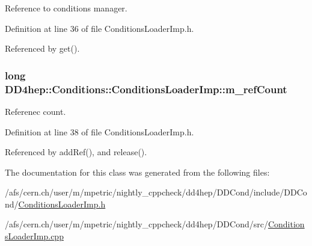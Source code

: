Reference to conditions manager. 

Definition at line 36 of file ConditionsLoaderImp.h.

Referenced by get().\hypertarget{class_d_d4hep_1_1_conditions_1_1_conditions_loader_imp_aa108f7ae2788453c48cd29ad11596c76}{
\subsubsection[{m\_\-refCount}]{\setlength{\rightskip}{0pt plus 5cm}long {\bf DD4hep::Conditions::ConditionsLoaderImp::m\_\-refCount}}}
\label{class_d_d4hep_1_1_conditions_1_1_conditions_loader_imp_aa108f7ae2788453c48cd29ad11596c76}


Referenec count. 

Definition at line 38 of file ConditionsLoaderImp.h.

Referenced by addRef(), and release().

The documentation for this class was generated from the following files:\begin{DoxyCompactItemize}
\item 
/afs/cern.ch/user/m/mpetric/nightly\_\-cppcheck/dd4hep/DDCond/include/DDCond/\hyperlink{_conditions_loader_imp_8h}{ConditionsLoaderImp.h}\item 
/afs/cern.ch/user/m/mpetric/nightly\_\-cppcheck/dd4hep/DDCond/src/\hyperlink{_conditions_loader_imp_8cpp}{ConditionsLoaderImp.cpp}\end{DoxyCompactItemize}
